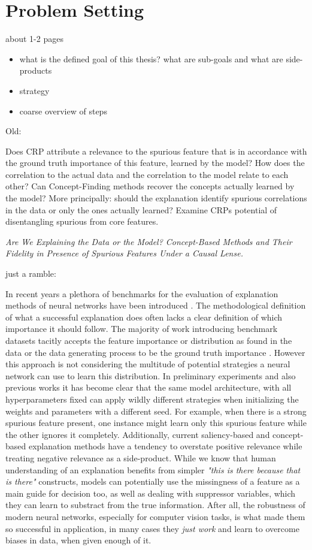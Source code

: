 \chapter{Problem Setting}\label{chapter:problem_setting}
{ \color{red}

    about 1-2 pages

    \begin{itemize}
        \item what is the defined goal of this thesis? what are sub-goals and what are side-products
        \item strategy
        \item coarse overview of steps
    \end{itemize}
}
Old:

Does CRP attribute a relevance to the spurious feature that is in accordance with the ground truth importance of this feature, learned by the model?
How does the correlation to the actual data and the correlation to the model relate to each other?
Can Concept-Finding methods recover the concepts actually learned by the model?
More principally: should the explanation identify spurious correlations in the data or only the ones actually learned?
Examine CRPs potential of disentangling spurious from core features.


\textit{Are We Explaining the Data or the Model?
Concept-Based Methods and Their Fidelity in Presence of Spurious Features Under a Causal Lense.}

just a ramble: 

In recent years a plethora of benchmarks for the evaluation of explanation methods of neural networks have been introduced .
The methodological definition of what a successful explanation does often lacks a clear definition of which importance it should follow. The majority of work introducing benchmark datasets tacitly accepts the feature importance or distribution as found in the data or the data generating process to be the ground truth importance . However this approach is not considering the multitude of potential strategies a neural network can use to learn this distribution. 
In preliminary experiments and also previous works it has become clear that the same model architecture, with all hyperparameters fixed can apply wildly different strategies when initializing the weights and parameters with a different seed. For example, when there is a strong spurious feature present, one instance might learn only this spurious feature while the other ignores it completely. 
Additionally, current saliency-based and concept-based explanation methods have a tendency to overstate positive relevance while treating negative relevance as a side-product. While we know that human understanding of an explanation benefits from simpler \textit{"this is there because that is there"} constructs, models can potentially use the missingness of a feature as a main guide for decision too, as well as dealing with suppressor variables, which they can learn to substract from the true information. After all, the robustness of modern neural networks, especially for computer vision tasks, is what made them so successful in application, in many cases they  \textit{just work} and learn to overcome biases in data, when given enough of it. 


